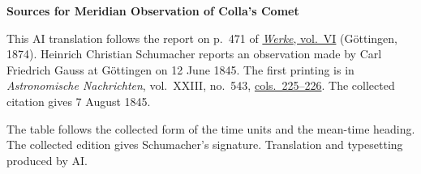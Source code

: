 \clearpage\thispagestyle{empty}
\begin{center}\textbf{Sources for Meridian Observation of Colla’s Comet}\end{center}
\noindent This AI translation follows the report on p.~471 of \href{https://gdz.sub.uni-goettingen.de/id/PPN236007467}{\textit{Werke}, vol.~VI} (Göttingen, 1874). Heinrich Christian Schumacher reports an observation made by Carl Friedrich Gauss at Göttingen on 12 June 1845. The first printing is in \textit{Astronomische Nachrichten}, vol.~XXIII, no.~543, \href{https://api.digitale-sammlungen.de/iiif/image/v2/bsb10049448_00121/full/1800,/0/default.jpg}{cols.~225--226}. The collected citation gives 7 August 1845.
\par\smallskip\noindent The table follows the collected form of the time units and the mean-time heading. The collected edition gives Schumacher’s signature. Translation and typesetting produced by AI.
\clearpage
